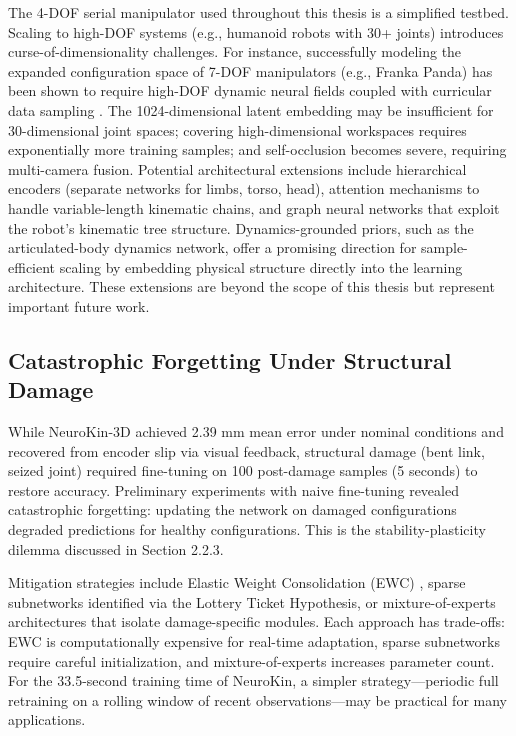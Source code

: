 \documentclass[12pt,a4paper,oneside]{report}
\begin{document}
The 4-DOF serial manipulator used throughout this thesis is a simplified testbed. Scaling to high-DOF systems (e.g., humanoid robots with 30+ joints) introduces curse-of-dimensionality challenges. For instance, successfully modeling the expanded configuration space of 7-DOF manipulators (e.g., Franka Panda) has been shown to require high-DOF dynamic neural fields coupled with curricular data sampling \cite{schulze2024high}. The 1024-dimensional latent embedding may be insufficient for 30-dimensional joint spaces; covering high-dimensional workspaces requires exponentially more training samples; and self-occlusion becomes severe, requiring multi-camera fusion. Potential architectural extensions include hierarchical encoders (separate networks for limbs, torso, head), attention mechanisms to handle variable-length kinematic chains, and graph neural networks that exploit the robot's kinematic tree structure. Dynamics-grounded priors, such as the articulated-body dynamics network, offer a promising direction for sample-efficient scaling by embedding physical structure directly into the learning architecture. These extensions are beyond the scope of this thesis but represent important future work.

\subsection{Catastrophic Forgetting Under Structural Damage}

While NeuroKin-3D achieved 2.39 mm mean error under nominal conditions and recovered from encoder slip via visual feedback, structural damage (bent link, seized joint) required fine-tuning on 100 post-damage samples (5 seconds) to restore accuracy. Preliminary experiments with naive fine-tuning revealed catastrophic forgetting: updating the network on damaged configurations degraded predictions for healthy configurations. This is the stability-plasticity dilemma discussed in Section 2.2.3.

Mitigation strategies include Elastic Weight Consolidation (EWC) \cite{kirkpatrick2017overcoming}, sparse subnetworks identified via the Lottery Ticket Hypothesis, or mixture-of-experts architectures that isolate damage-specific modules. Each approach has trade-offs: EWC is computationally expensive for real-time adaptation, sparse subnetworks require careful initialization, and mixture-of-experts increases parameter count. For the 33.5-second training time of NeuroKin, a simpler strategy---periodic full retraining on a rolling window of recent observations---may be practical for many applications.
\end{document}
